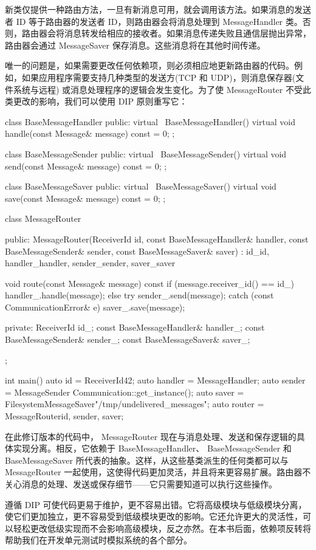 新类仅提供一种路由方法，一旦有新消息可用，就会调用该方法。如果消息的发送者 ID 等于路由器的发送者 ID，则路由器会将消息处理到 MessageHandler 类。否则，路由器会将消息转发给相应的接收者。如果消息传递失败且通信层抛出异常，路由器会通过 MessageSaver 保存消息。这些消息将在其他时间传递。

唯一的问题是，如果需要更改任何依赖项，则必须相应地更新路由器的代码。例如，如果应用程序需要支持几种类型的发送方(TCP 和 UDP)，则消息保存器(文件系统与远程) 或消息处理程序的逻辑会发生变化。为了使 MessageRouter 不受此类更改的影响，我们可以使用 DIP 原则重写它：

\begin{cpp}
class BaseMessageHandler {
public:
    virtual ~BaseMessageHandler() {}
    virtual void handle(const Message& message) const = 0;
};

class BaseMessageSender {
public:
    virtual ~BaseMessageSender() {}
    virtual void send(const Message& message) const = 0;
};

class BaseMessageSaver {
public:
    virtual ~BaseMessageSaver() {}
    virtual void save(const Message& message) const = 0;
};

class MessageRouter {
public:
    MessageRouter(ReceiverId id,
                  const BaseMessageHandler& handler,
                  const BaseMessageSender& sender,
                  const BaseMessageSaver& saver)
        : id_{id}, handler_{handler}, sender_{sender},
            saver_{saver} {}

    void route(const Message& message) const {
        if (message.receiver_id() == id_) {
            handler_.handle(message);
        } else {
            try {
                sender_.send(message);
            } catch (const CommunicationError& e) {
                saver_.save(message);
            }
        }
    }

private:
    ReceiverId id_;
    const BaseMessageHandler& handler_;
    const BaseMessageSender& sender_;
    const BaseMessageSaver& saver_;
};

int main() {
    auto id = ReceiverId{42};
    auto handler = MessageHandler{};
    auto sender = MessageSender{
        Communication::get_instance()};
    auto saver =
        FilesystemMessageSaver{"/tmp/undelivered_messages"};
    auto router = MessageRouter{id, sender, saver};
}
\end{cpp}

在此修订版本的代码中， MessageRouter 现在与消息处理、发送和保存逻辑的具体实现分离。相反，它依赖于 BaseMessageHandler、 BaseMessageSender 和 BaseMessageSaver 所代表的抽象。这样，从这些基类派生的任何类都可以与 MessageRouter 一起使用，这使得代码更加灵活，并且将来更容易扩展。路由器不关心消息的处理、发送或保存细节——它只需要知道可以执行这些操作。

遵循 DIP 可使代码更易于维护，更不容易出错。它将高级模块与低级模块分离，使它们更加独立，更不容易受到低级模块更改的影响。它还允许更大的灵活性，可以轻松更改低级实现而不会影响高级模块，反之亦然。在本书后面，依赖项反转将帮助我们在开发单元测试时模拟系统的各个部分。
























